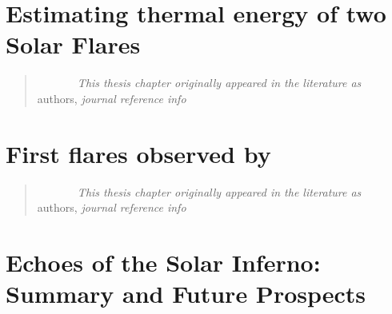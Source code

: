 \documentclass[keepsake]{hvdthesis}
\begin{document}
\chapter{Estimating thermal energy of two Solar Flares}\label{c:chap6}
\begin{quote}
{\em ~~~~~~~This thesis chapter originally appeared in the literature as} \\
{authors,
{\em journal reference info}}
\end{quote}

\clearpage
%
\chapter{First flares observed by {\suit}}\label{c:chap7}
\begin{quote}
{\em ~~~~~~~This thesis chapter originally appeared in the literature as} \\
{authors,
{\em journal reference info}}
\end{quote}

\clearpage
%

\chapter{Echoes of the Solar Inferno: Summary and Future Prospects}\label{c:chap8}

\clearpage

\singlespace
%

\end{document}

